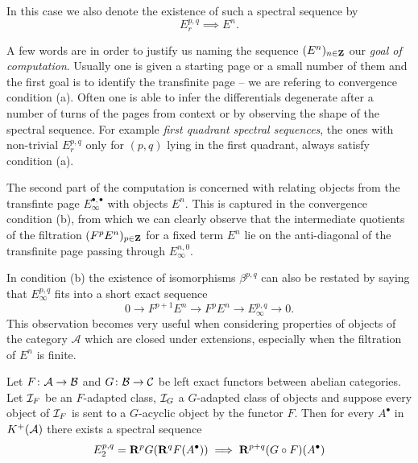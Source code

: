 \begin{definition}
In this case we also denote the existence of such a spectral sequence by 
\[
    E^{p,q}_r \implies E^n.
\]
\end{definition}

\begin{remark}
    A few words are in order to justify us naming the sequence $(E^n)_{n \in \mathbf Z}$ our \emph{goal of computation}. Usually one is given a starting page or a small number of them and the first goal is to identify the transfinite page -- we are refering to convergence condition (a). Often one is able to infer the differentials degenerate after a number of turns of the pages from context or by observing the shape of the spectral sequence. For example \emph{first quadrant spectral sequences}, \ie the ones with non-trivial $E^{p,q}_r$ only for $(p,q)$ lying in the first quadrant, always satisfy condition (a).
    
    The second part of the computation is concerned with relating objects from the transfinte page $E^{\bullet, \bullet}_\infty$ with objects $E^n$. This is captured in the convergence condition (b), from which we can clearly observe that the intermediate quotients of the filtration $(F^p E^n)_{p \in \mathbf Z}$ for a fixed term $E^n$ lie on the anti-diagonal of the transfinite page passing through \eg $E^{n, 0}_\infty$.
    
    In condition (b) the existence of isomorphisms $\beta^{p,q}$ can also be restated by saying that $E^{p,q}_\infty$ fits into a short exact sequence
    \[
        0 \to F^{p + 1} E^n \to F^p E^n \to E^{p,q}_\infty \to 0.
    \]
    This observation becomes very useful when considering properties of objects of the category $\mathcal A$ which are closed under extensions, especially when the filtration of $E^n$ is finite.

 \end{remark}



\begin{theorem}[Grothendieck]
    Let $F\colon \mathcal A \to \mathcal B$ and $G\colon \mathcal B \to \mathcal C$ be left exact functors between abelian categories. Let $\mathcal I_F$ be an $F$-adapted class, $\mathcal I_G$ a $G$-adapted class of objects and suppose every object of $\mathcal I_F$ is sent to a $G$-acyclic object by the functor $F$. Then for every $A^\bullet$ in $K^+(\mathcal A)$ there exists a spectral sequence
    \[
        E^{p,q}_2 = \mathbf{R}^{p}G(\mathbf{R}^{q}F(A^\bullet)) \implies \mathbf{R}^{p+q}(G \circ F)(A^\bullet)
    \] 
\end{theorem}
